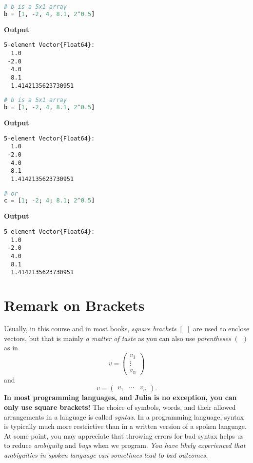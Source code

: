 \begin{lstlisting}[language=Julia,style=mystyle]
# b is a 5x1 array
b = [1, -2, 4, 8.1, 2^0.5]
\end{lstlisting}
\textbf{Output}
\begin{verbatim}
5-element Vector{Float64}:
  1.0
 -2.0
  4.0
  8.1
  1.4142135623730951
\end{verbatim}

\begin{lstlisting}[language=Julia,style=mystyle]
# b is a 5x1 array
b = [1, -2, 4, 8.1, 2^0.5]
\end{lstlisting}
\textbf{Output}
\begin{verbatim}
5-element Vector{Float64}:
  1.0
 -2.0
  4.0
  8.1
  1.4142135623730951
\end{verbatim}
\begin{lstlisting}[language=Julia,style=mystyle]
# or 
c = [1; -2; 4; 8.1; 2^0.5]
\end{lstlisting}
\textbf{Output}
\begin{verbatim}
5-element Vector{Float64}:
  1.0
 -2.0
  4.0
  8.1
  1.4142135623730951
\end{verbatim}

\section{Remark on Brackets}

Usually, in this course and in most books, \textit{square brackets} $[~~]$ are used to enclose vectors, but that is mainly \textit{a matter of taste} as you can also use \textit{parentheses} $(~~)$ as in
\begin{equation}
    \label{eq:nColumnVectorParen}
    v=\left(\begin{array}{c} v_1 \\ \vdots \\ v_n \end{array} \right)
\end{equation}
and 
\begin{equation}
    \label{eq:nRowVectorParen}
    v=\left(\begin{array}{ccc} v_1 & \cdots & v_n \end{array} \right).
\end{equation}
\textbf{In most programming languages, and Julia is no exception, you can only use square brackets!} The choice of symbols, words, and their allowed arrangements in a language is called \textit{syntax}. In a  programming language, syntax is typically much more restrictive than in a written version of a spoken language. At some point, you may appreciate that throwing errors for bad syntax helps us to reduce \textit{ambiguity} and \textit{bugs} when we program. \textit{You have likely experienced that ambiguities in spoken language can sometimes lead to bad outcomes.} 

